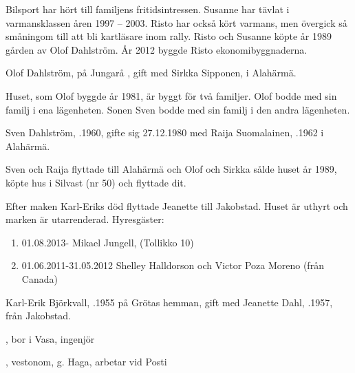 Bilsport har hört till familjens fritidsintressen. Susanne har tävlat i varmansklassen åren 1997 – 2003. Risto har också kört varmans, men övergick så småningom till att bli kartläsare inom rally. Risto och Susanne köpte år 1989 gården av Olof Dahlström. År 2012 byggde Risto ekonomibyggnaderna.


Olof Dahlström,  på Jungarå , gift med Sirkka Sipponen,  i Alahärmä.
\begin{jhchildren}
  \item {}
  \item {}
  \item {}
\end{jhchildren}

Huset, som Olof byggde år 1981, är byggt för två familjer. Olof bodde med sin familj i ena lägenheten. Sonen Sven bodde med sin familj i den andra lägenheten.

Sven Dahlström, .1960, gifte sig 27.12.1980 med Raija Suomalainen, .1962 i Alahärmä.
\begin{jhchildren}
  \item {}
  \item {}
\end{jhchildren}

Sven och Raija flyttade till Alahärmä och Olof och Sirkka sålde huset år 1989, köpte hus i Silvast (nr 50) och flyttade dit.






Efter maken Karl-Eriks död flyttade Jeanette till Jakobstad. Huset är uthyrt och marken är utarrenderad.
Hyresgäster:
\begin{enumerate}
  \item 01.08.2013-   Mikael Jungell,  (Tollikko 10)
  \item 01.06.2011-31.05.2012  Shelley Halldorson och Victor Poza Moreno (från Canada)
\end{enumerate}


Karl-Erik Björkvall, .1955 på Grötas hemman, gift med Jeanette Dahl, .1957, från Jakobstad.
\begin{jhchildren}
  \item {}, bor i Vasa, ingenjör
  \item {}, vestonom, g. Haga, arbetar vid Posti
\end{jhchildren}


